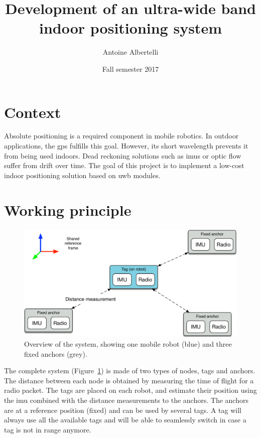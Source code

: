 \documentclass[a4paper,twocolumn]{article}
\date{Fall semester 2017}
\title{Development of an ultra-wide band indoor positioning system}
\author{Antoine Albertelli}
\begin{document}
\maketitle
{}

\section{Context}

Absolute positioning is a required component in mobile robotics.
In outdoor applications, the \gls{gps} fulfills this goal.
However, its short wavelength prevents it from being used indoors.
Dead reckoning solutions such as \glspl{imu} or optic flow suffer from drift over time.
The goal of this project is to implement a low-cost indoor positioning solution based on \gls{uwb} modules.

\section{Working principle}

\begin{figure}[h!]
    \centering
    \includegraphics[width=\textwidth]{figures/system.pdf}
    \caption{Overview of the system, showing one mobile robot (blue) and three fixed anchors (grey).}
    \label{fig:system}
\end{figure}

The complete system (Figure~\ref{fig:system}) is made of two types of nodes, tags and anchors.
The distance between each node is obtained by measuring the time of flight for a radio packet.
The tags are placed on each robot, and estimate their position using the \gls{imu} combined with the distance measurements to the anchors.
The anchors are at a reference position (fixed) and can be used by several tags.
A tag will always use all the available tags and will be able to seamlessly switch in case a tag is not in range anymore.
\end{document}
